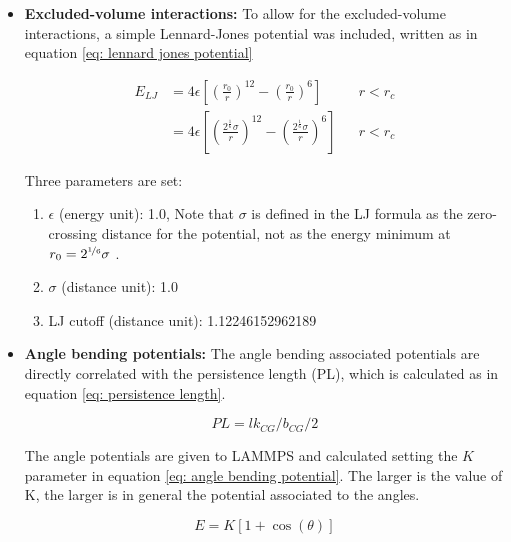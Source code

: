 \begin{itemize}
    \item \textbf{Excluded-volume interactions: } To allow for the excluded-volume interactions, a simple Lennard-Jones potential was included, written as in equation \ref{eq: lennard jones potential} %

    \begin{align} \label{eq: lennard jones potential}
        E_{LJ} &= 4 \epsilon \left[\left(\frac{r_0}{r}\right)^{12} - \left(\frac{r_0}{r}\right)^6\right]&& r < r_c \nonumber\\
            &= 4 \epsilon \left[\left(\frac{2^{\frac{1}{6}}\sigma}{r}\right)^{12} - \left(\frac{2^{\frac{1}{6}}\sigma}{r}\right)^6\right]&& r < r_c 
    \end{align}


    Three parameters are set:

    \begin{enumerate} %
        \item $\epsilon$ (energy unit): 1.0, Note that $\sigma$ is defined in the LJ formula as the zero-crossing distance for the potential, not as the energy minimum at $r_0 = 2^{\nicefrac{1}{6}} \sigma$ .
        \item $\sigma$ (distance unit): 1.0
        \item LJ cutoff (distance unit): 1.12246152962189
    \end{enumerate}

    \item \textbf{Angle bending potentials: }The angle bending associated potentials are directly correlated with the persistence length (PL), which is calculated as in equation \ref{eq: persistence length}.

    \begin{equation} \label{eq: persistence length}
        PL = lk_{CG} / b_{CG} / 2
    \end{equation}

    The angle potentials are given to LAMMPS and calculated setting the $K$ parameter in equation \ref{eq: angle bending potential}. The larger is the value of K, the larger is in general the potential associated to the angles.

    \begin{equation} \label{eq: angle bending potential}
        E = K[1 + \cos{(\theta)}]    
    \end{equation}

\end{itemize}


